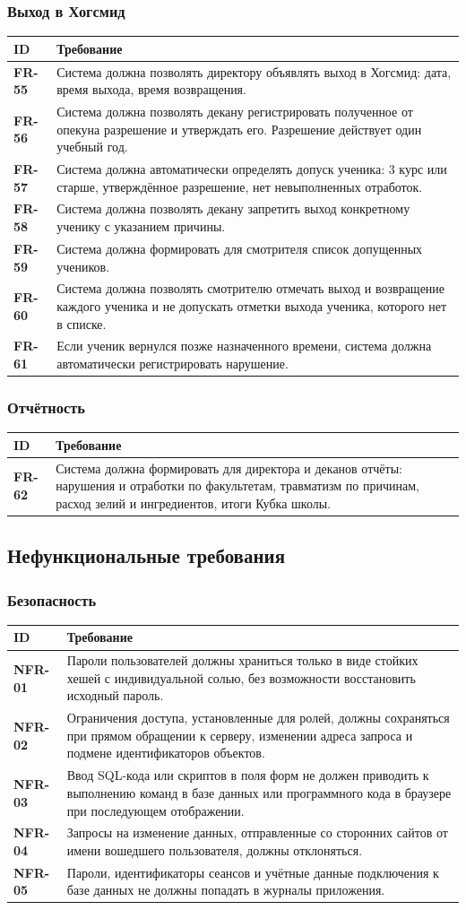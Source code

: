 \documentclass[a4paper,12pt]{article}
\newcommand{\req}[2]{\textbf{#1} & #2 \\ \hline}
\newenvironment{reqtable}{%
  \begin{longtable}{|>{\raggedright\arraybackslash}p{19mm}|>{\raggedright\arraybackslash}p{137mm}|}
  \hline
  \rowcolor{black!8}\textbf{ID} & \textbf{Требование} \\ \hline
  \endhead}{\end{longtable}}
\begin{document}
\subsubsection{Выход в Хогсмид}
\begin{reqtable}
\req{FR-55}{Система должна позволять директору объявлять выход в Хогсмид: дата, время выхода, время возвращения.}
\req{FR-56}{Система должна позволять декану регистрировать полученное от опекуна разрешение и утверждать его. Разрешение действует один учебный год.}
\req{FR-57}{Система должна автоматически определять допуск ученика: 3 курс или старше, утверждённое разрешение, нет невыполненных отработок.}
\req{FR-58}{Система должна позволять декану запретить выход конкретному ученику с указанием причины.}
\req{FR-59}{Система должна формировать для смотрителя список допущенных учеников.}
\req{FR-60}{Система должна позволять смотрителю отмечать выход и возвращение каждого ученика и не допускать отметки выхода ученика, которого нет в списке.}
\req{FR-61}{Если ученик вернулся позже назначенного времени, система должна автоматически регистрировать нарушение.}
\end{reqtable}
 
\subsubsection{Отчётность}
\begin{reqtable}
\req{FR-62}{Система должна формировать для директора и деканов отчёты: нарушения и отработки по факультетам, травматизм по причинам, расход зелий и ингредиентов, итоги Кубка школы.}
\end{reqtable}
 
\subsection{Нефункциональные требования}
 
\subsubsection{Безопасность}
\begin{reqtable}
\req{NFR-01}{Пароли пользователей должны храниться только в виде стойких хешей с индивидуальной солью, без возможности восстановить исходный пароль.}
\req{NFR-02}{Ограничения доступа, установленные для ролей, должны сохраняться при прямом обращении к серверу, изменении адреса запроса и подмене идентификаторов объектов.}
\req{NFR-03}{Ввод SQL-кода или скриптов в поля форм не должен приводить к выполнению команд в базе данных или программного кода в браузере при последующем отображении.}
\req{NFR-04}{Запросы на изменение данных, отправленные со сторонних сайтов от имени вошедшего пользователя, должны отклоняться.}
\req{NFR-05}{Пароли, идентификаторы сеансов и учётные данные подключения к базе данных не должны попадать в журналы приложения.}
\end{reqtable}
 
\end{document}
